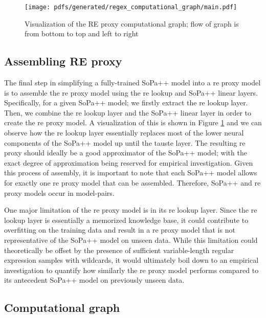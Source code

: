 \begin{figure}[t!]
  \centering
  \texttt{[image: pdfs/generated/regex\_computational\_graph/main.pdf]}
  \caption{Visualization of the RE proxy computational graph; flow of graph is
    from bottom to top and left to right}
  \label{fig:regex_cg}
\end{figure}

\subsection{Assembling RE proxy}

The final step in simplifying a fully-trained SoPa++ model into a \ac{re} proxy model
is to assemble the \ac{re} proxy model using the \ac{re} lookup and SoPa++ linear layers.
Specifically, for a given SoPa++ model; we firstly extract the \ac{re} lookup layer.
Then, we combine the \ac{re} lookup layer and the SoPa++ linear layer in order to
create the \ac{re} proxy model. A visualization of this is shown in Figure
\ref{fig:regex_cg} and we can observe how the \ac{re} lookup layer essentially
replaces most of the lower neural components of the SoPa++ model up until the
\ac{tauste} layer. The resulting \ac{re} proxy should ideally be a good approximator of
the SoPa++ model; with the exact degree of approximation being reserved for
empirical investigation. Given this process of assembly, it is important to note
that each SoPa++ model allows for exactly one \ac{re} proxy model that can be
assembled. Therefore, SoPa++ and \ac{re} proxy models occur in model-pairs.

One major limitation of the \ac{re} proxy model is in its \ac{re} lookup layer. Since the
\ac{re} lookup layer is essentially a memorized knowledge base, it could contribute
to overfitting on the training data and result in a \ac{re} proxy model that is not
representative of the SoPa++ model on unseen data. While this limitation could
theoretically be offset by the presence of sufficient variable-length regular
expression samples with wildcards, it would ultimately boil down to an empirical
investigation to quantify how similarly the \ac{re} proxy model performs compared to
its antecedent SoPa++ model on previously unseen data.

\subsection{Computational graph}

\label{section:re_cg}

